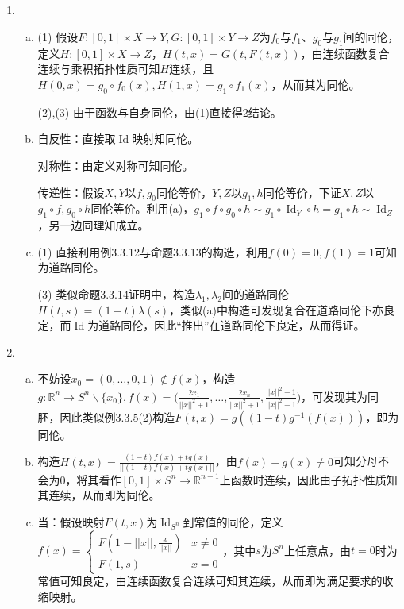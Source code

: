 \documentclass[a4paper,UTF8,fontset=windows]{ctexart}
\DeclareMathOperator{\Id}{Id}
\begin{document}
\subsection{}
\begin{enumerate}[(1)]
    \item
    \begin{enumerate}[(a)]
    \item
    (1) 假设$F:[0,1]\times X\to Y,G:[0,1]\times Y\to Z$为$f_0$与$f_1$、$g_0$与$g_1$间的同伦，定义$H:[0,1]\times X\to Z$，$H(t,x)=G(t,F(t,x))$，由连续函数复合连续与乘积拓扑性质可知$H$连续，且$H(0,x)=g_0\circ f_0(x),H(1,x)=g_1\circ f_1(x)$，从而其为同伦。
    
    (2),(3) 由于函数与自身同伦，由(1)直接得2结论。
    
    \item
    自反性：直接取$\Id$映射知同伦。
    
    对称性：由定义对称可知同伦。
    
    传递性：假设$X,Y$以$f,g_0$同伦等价，$Y,Z$以$g_1,h$同伦等价，下证$X,Z$以$g_1\circ f,g_0\circ h$同伦等价。利用(a)，$g_1\circ f\circ g_0\circ h\sim g_1\circ\Id_Y \circ h=g_1\circ h\sim \Id_Z$，另一边同理知成立。
    
    \item
    (1) 直接利用例3.3.12与命题3.3.13的构造，利用$f(0)=0,f(1)=1$可知为道路同伦。
    
    (3) 类似命题3.3.14证明中，构造$\lambda_1,\lambda_2$间的道路同伦$H(t,s)=(1-t)\lambda(s)$，类似(a)中构造可发现复合在道路同伦下亦良定，而$\Id$为道路同伦，因此“推出”在道路同伦下良定，从而得证。
    \end{enumerate}
    
    \item
    \begin{enumerate}[(a)]
    \item
    不妨设$x_0=(0,\dots,0,1)\notin f(x)$，构造$g:\mathbb{R}^{n}\to S^n\backslash\{x_0\},f(x)=\big(\frac{2x_1}{||x||^2+1},\dots,\frac{2x_n}{||x||^2+1},\frac{||x||^2-1}{||x||^2+1}\big)$，可发现其为同胚，因此类似例3.3.5(2)构造$F(t,x)=g((1-t)g^{-1}(f(x)))$，即为同伦。
    
    \item
    构造$H(t,x)=\frac{(1-t)f(x)+tg(x)}{||(1-t)f(x)+tg(x)||}$，由$f(x)+g(x)\ne0$可知分母不会为0，将其看作$[0,1]\times S^n\to\mathbb{R}^{n+1}$上函数时连续，因此由子拓扑性质知其连续，从而即为同伦。
    
    \item
    当：假设映射$F(t,x)$为$\Id_{S^n}$到常值的同伦，定义$f(x)=\begin{cases}F(1-||x||,\frac{x}{||x||})&x\ne0\\F(1,s)&x=0\end{cases}$，其中$s$为$S^n$上任意点，由$t=0$时为常值可知良定，由连续函数复合连续可知其连续，从而即为满足要求的收缩映射。
    

\end{enumerate}
\end{enumerate}
\end{document}
